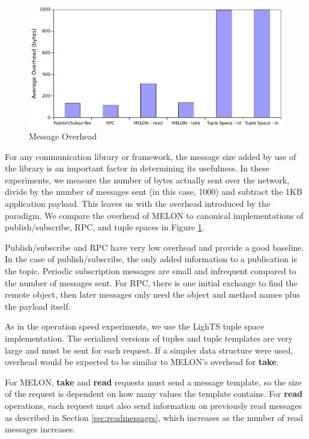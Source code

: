 \documentclass[lnicst]{svmultln}
\begin{document}
\begin{figure}
\centering
\includegraphics[scale = .50, clip, trim = 0px 0px 0px 0px]{figures/overhead.pdf}
\caption{Message Overhead}
\label{fig:overhead}
\end{figure}

For any communication library or framework, the message size added by use of the library is an important factor in determining its usefulness. In these experiments, we measure the number of bytes actually sent over the network, divide by the number of messages sent (in this case, 1000) and subtract the 1KB application payload. This leaves us with the overhead introduced by the paradigm. We compare the overhead of MELON to canonical implementations of publish/subscribe, RPC, and tuple spaces in Figure \ref{fig:overhead}.

Publish/subscribe and RPC have very low overhead and provide a good baseline. In the case of publish/subscribe, the only added information to a publication is the topic. Periodic subscription messages are small and infrequent compared to the number of messages sent. For RPC, there is one initial exchange to find the remote object, then later messages only need the object and method names plus the payload itself.

As in the operation speed experiments, we use the LighTS tuple space implementation. The serialized versions of tuples and tuple templates are very large and must be sent for each request. If a simpler data structure were used, overhead would be expected to be similar to MELON's overhead for \textbf{take}.

For MELON, \textbf{take} and \textbf{read} requests must send a message template, so the size of the request is dependent on how many values the template contains. For \textbf{read} operations, each request must also send information on previously read messages as described in Section \ref{sec:readmessages}, which increases as the number of read messages increases.
\end{document}

